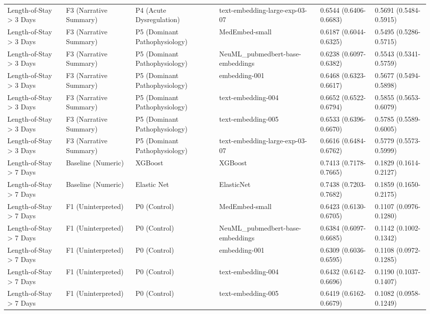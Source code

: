 \documentclass[border=0pt]{standalone}
\begin{document}
\begin{adjustbox}{width=\textwidth}
\begin{tabular}{llllll}
Length-of-Stay \textgreater{} 3 Days & F3 (Narrative Summary) & P4 (Acute Dysregulation) & text-embedding-large-exp-03-07 & 0.6544 (0.6406-0.6683) & 0.5691 (0.5484-0.5915) \\
Length-of-Stay \textgreater{} 3 Days & F3 (Narrative Summary) & P5 (Dominant Pathophysiology) & MedEmbed-small & 0.6187 (0.6044-0.6325) & 0.5495 (0.5286-0.5715) \\
Length-of-Stay \textgreater{} 3 Days & F3 (Narrative Summary) & P5 (Dominant Pathophysiology) & NeuML\_pubmedbert-base-embeddings & 0.6238 (0.6097-0.6382) & 0.5543 (0.5341-0.5759) \\
Length-of-Stay \textgreater{} 3 Days & F3 (Narrative Summary) & P5 (Dominant Pathophysiology) & embedding-001 & 0.6468 (0.6323-0.6617) & 0.5677 (0.5494-0.5898) \\
Length-of-Stay \textgreater{} 3 Days & F3 (Narrative Summary) & P5 (Dominant Pathophysiology) & text-embedding-004 & 0.6652 (0.6522-0.6794) & 0.5855 (0.5653-0.6079) \\
Length-of-Stay \textgreater{} 3 Days & F3 (Narrative Summary) & P5 (Dominant Pathophysiology) & text-embedding-005 & 0.6533 (0.6396-0.6670) & 0.5785 (0.5589-0.6005) \\
Length-of-Stay \textgreater{} 3 Days & F3 (Narrative Summary) & P5 (Dominant Pathophysiology) & text-embedding-large-exp-03-07 & 0.6616 (0.6484-0.6762) & 0.5779 (0.5573-0.5999) \\
Length-of-Stay \textgreater{} 7 Days & Baseline (Numeric) & XGBoost & XGBoost & 0.7413 (0.7178-0.7665) & 0.1829 (0.1614-0.2127) \\
Length-of-Stay \textgreater{} 7 Days & Baseline (Numeric) & Elastic Net & ElasticNet & 0.7438 (0.7203-0.7682) & 0.1859 (0.1650-0.2175) \\
Length-of-Stay \textgreater{} 7 Days & F1 (Uninterpreted) & P0 (Control) & MedEmbed-small & 0.6423 (0.6130-0.6705) & 0.1107 (0.0976-0.1280) \\
Length-of-Stay \textgreater{} 7 Days & F1 (Uninterpreted) & P0 (Control) & NeuML\_pubmedbert-base-embeddings & 0.6384 (0.6097-0.6685) & 0.1142 (0.1002-0.1342) \\
Length-of-Stay \textgreater{} 7 Days & F1 (Uninterpreted) & P0 (Control) & embedding-001 & 0.6309 (0.6036-0.6595) & 0.1108 (0.0972-0.1285) \\
Length-of-Stay \textgreater{} 7 Days & F1 (Uninterpreted) & P0 (Control) & text-embedding-004 & 0.6432 (0.6142-0.6696) & 0.1190 (0.1037-0.1407) \\
Length-of-Stay \textgreater{} 7 Days & F1 (Uninterpreted) & P0 (Control) & text-embedding-005 & 0.6419 (0.6162-0.6679) & 0.1082 (0.0958-0.1249) \\

\end{tabular}
\end{adjustbox}
\end{document}
